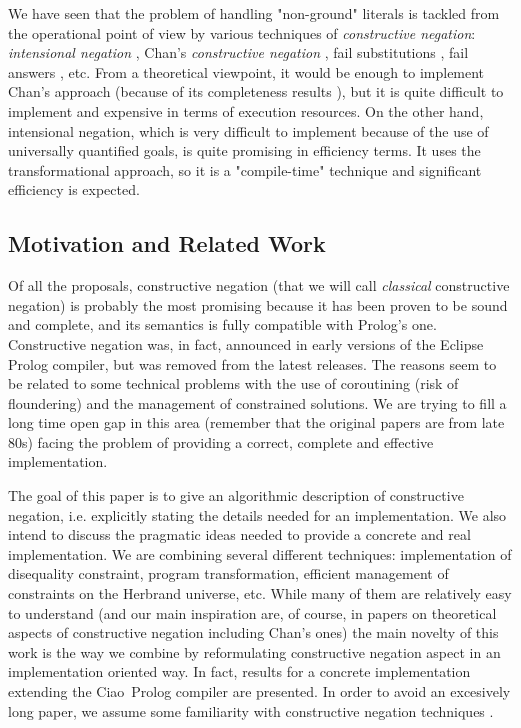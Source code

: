 \documentclass{tlp}
\newcommand{\ciao}{Ciao}
\begin{document}
We have seen that the problem of handling "non-ground" literals is
tackled from the operational point of view by various techniques of
{\em constructive negation}: {\em intensional negation}
\cite{Barbuti1,Barbuti2}, Chan's {\em constructive negation}
\cite{Chan1,Chan2,Stuckey93}, fail substitutions \cite{Malus}, fail
answers \cite{Drabent}, etc. From a theoretical viewpoint, it would be
enough to implement Chan's approach (because of its completeness
results \cite{Stuckey93}), but it is quite difficult to implement and
expensive in terms of execution resources.  On the other hand,
intensional negation, which is very difficult to implement because of
the use of universally quantified goals, is quite promising in
efficiency terms.  It uses the transformational approach, so it is a
"compile-time" technique and significant efficiency is expected.%

\subsection{Motivation and Related Work}

Of all the proposals, constructive negation \cite{Chan1,Chan2} (that
we will call \emph{classical} constructive negation) is probably the
most promising because it has been proven to be sound and complete,
and its semantics is fully compatible with Prolog's one. Constructive
negation was, in fact, announced in early versions of the Eclipse
Prolog compiler, but was removed from the latest releases.  The
reasons seem to be related to some technical problems with the use of
coroutining (risk of floundering) and the management of constrained
solutions. We are trying to fill a long time open gap in this area
(remember that the original papers are from late 80s) facing the
problem of providing a correct, complete and effective implementation.

The goal of this paper is to give an algorithmic description of
constructive negation, i.e. explicitly stating the details needed for
an implementation. We also intend to discuss the pragmatic ideas
needed to provide a concrete and real implementation.  We are
combining several different techniques: implementation of disequality
constraint, program transformation, efficient management of
constraints on the Herbrand universe, etc. While many of them are
relatively easy to understand (and our main inspiration are, of
course, in papers on theoretical aspects of constructive negation
including Chan's ones) the main novelty of this work is the way we
combine by reformulating constructive negation aspect in an
implementation oriented way.  In fact, results for a concrete
implementation extending the \ciao\ Prolog compiler are presented.
In order to avoid an excesively long paper, we assume some familiarity with constructive
negation techniques \cite{Chan1,Chan2}.
\end{document}

